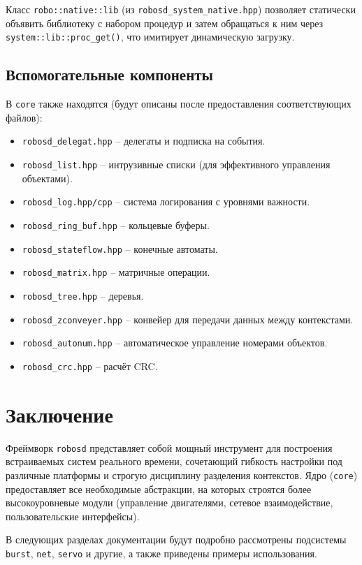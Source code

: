 \documentclass[a4paper,12pt]{article}
\begin{document}
Класс \texttt{robo::native::lib} (из \texttt{robosd\_system\_native.hpp}) позволяет статически объявить библиотеку с набором процедур и затем обращаться к ним через \texttt{system::lib::proc\_get()}, что имитирует динамическую загрузку.

\subsection{Вспомогательные компоненты}

В \texttt{core} также находятся (будут описаны после предоставления соответствующих файлов):
\begin{itemize}
    \item \texttt{robosd\_delegat.hpp} -- делегаты и подписка на события.
    \item \texttt{robosd\_list.hpp} -- интрузивные списки (для эффективного управления объектами).
    \item \texttt{robosd\_log.hpp/cpp} -- система логирования с уровнями важности.
    \item \texttt{robosd\_ring\_buf.hpp} -- кольцевые буферы.
    \item \texttt{robosd\_stateflow.hpp} -- конечные автоматы.
    \item \texttt{robosd\_matrix.hpp} -- матричные операции.
    \item \texttt{robosd\_tree.hpp} -- деревья.
    \item \texttt{robosd\_zconveyer.hpp} -- конвейер для передачи данных между контекстами.
    \item \texttt{robosd\_autonum.hpp} -- автоматическое управление номерами объектов.
    \item \texttt{robosd\_crc.hpp} -- расчёт CRC.
\end{itemize}

\section{Заключение}

Фреймворк \texttt{robosd} представляет собой мощный инструмент для построения встраиваемых систем реального времени, сочетающий гибкость настройки под различные платформы и строгую дисциплину разделения контекстов. Ядро (\texttt{core}) предоставляет все необходимые абстракции, на которых строятся более высокоуровневые модули (управление двигателями, сетевое взаимодействие, пользовательские интерфейсы).

В следующих разделах документации будут подробно рассмотрены подсистемы \texttt{burst}, \texttt{net}, \texttt{servo} и другие, а также приведены примеры использования.
\end{document}
